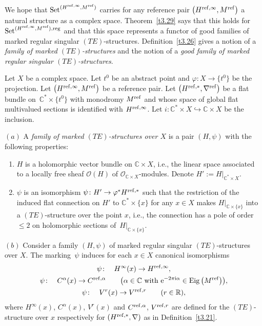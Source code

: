 \documentclass[pdftex]{sigma}%
\numberwithin{equation}{section}
\numberwithin{figure}{section}
\newcommand{\C}{{\mathbb C}}
\newcommand{\R}{{\mathbb R}}
\newcommand{\OO}{{\mathcal O}}
\newcommand{\nnn}{\nabla}
\DeclareMathOperator{\Eig}{Eig}
\begin{document}
We hope that ${\rm Set}^{(H^{{\rm ref},\infty},M^{\rm ref})}$ carries for
any reference pair $\big(H^{{\rm ref},\infty},M^{\rm ref}\big)$ a natural
structure as a complex space.
Theorem~\ref{t3.29} says that this holds for
${\rm Set}^{(H^{{\rm ref},\infty},M^{\rm ref}),{\rm reg}}$
and that this space represents a functor of good families
of marked regular singular $(TE)$-structures.
Definition~\ref{t3.26} gives a notion of a
{\it family of marked $(TE)$-structures}
and the notion of a {\it good family of marked regular
singular $(TE)$-structures}.

\begin{Definition}\label{t3.26}
Let $X$ be a complex space.
Let $t^0$ be an abstract point and
$\varphi\colon X\to\big\{t^0\big\}$ be the projection.
Let $\big(H^{{\rm ref},\infty},M^{\rm ref}\big)$ be a reference pair.
Let $\big(H^{{\rm ref},*},\nnn^{\rm ref}\big)$ be a flat bundle
on~$\C^*\times\big\{t^0\big\}$ with monodromy $M^{\rm ref}$
and whose space of global flat multivalued sections
is identified with $H^{{\rm ref},\infty}$.
Let $i\colon \C^*\times X\hookrightarrow \C\times X$
be the inclusion.

$(a)$ A {\it family of marked $(TE)$-structures over $X$}
is a pair $(H,\psi)$ with the following properties:
\begin{enumerate}\itemsep=0pt\setlength{\leftskip}{0.65cm}
\item[$(i)$]
$H$ is a holomorphic vector bundle on $\C\times X$,
i.e., the linear space associated to a locally free sheaf
$\OO(H)$ of $\OO_{\C\times X}$-modules.
Denote $H':=H|_{\C^*\times X}$.
\item[$(ii)$]
$\psi$ is an isomorphism $\psi\colon H'\to \varphi^* H^{{\rm ref},*}$
such that the restriction of the induced flat connection on $H'$
to $\C^*\times\{x\}$ for any $x\in X$ makes $H|_{\C\times\{x\}}$
into a $(TE)$-structure over the point $x$, i.e.,
the connection has a pole of order $\leq 2$ on holomorphic
sections of~$H|_{\C\times\{x\}}$.
\end{enumerate}

$(b)$ Consider a family $(H,\psi)$ of marked
regular singular $(TE)$-structures over $X$.
The marking~$\psi$ induces for each $x\in X$
canonical isomorphisms
\begin{gather*}
\psi\colon\quad H^\infty(x)\to H^{{\rm ref},\infty},%
\\
\psi\colon\quad C^{\alpha}(x)\to C^{{\rm ref},\alpha}\qquad
\big(\alpha\in\C\text{ with }{\rm e}^{-2\pi {\rm i}\alpha}\in\Eig\big(M^{\rm ref}\big)\big),
\nonumber
\\
\psi\colon\quad V^r(x)\to V^{{\rm ref},r} \qquad (r\in\R), \nonumber
\end{gather*}
where $H^{\infty}(x)$, $C^{\alpha}(x)$, $V^r(x)$ and
$C^{{\rm ref},\alpha}$, $V^{{\rm ref},r}$ are defined for the
$(TE)$-structure over $x$ respectively for $(H^{{\rm ref},*},\nnn)$
as in Definition~\ref{t3.21}.


\end{Definition}
\end{document}
